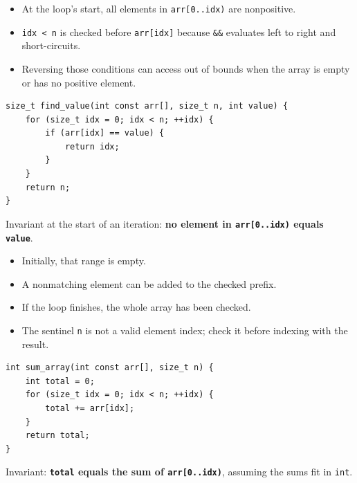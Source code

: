 \documentclass[11pt,a4paper]{article}
\providecommand{\tightlist}{\setlength{\itemsep}{0pt}\setlength{\parskip}{0pt}}
\begin{document}
\begin{itemize}
\tightlist
\item
  At the loop's start, all elements in \texttt{arr{[}0..idx)} are nonpositive.
\item
  \texttt{idx\ \textless{}\ n} is checked before \texttt{arr{[}idx{]}} because \texttt{\&\&} evaluates left to right and short-circuits.
\item
  Reversing those conditions can access out of bounds when the array is empty or has no positive element.
\end{itemize}

\label{linear-search-and-summation}
\hypertarget{linear-search-and-summation}{}

\label{linear-search}
\hypertarget{linear-search}{}

\begin{lstlisting}[style=cscode]
size_t find_value(int const arr[], size_t n, int value) {
    for (size_t idx = 0; idx < n; ++idx) {
        if (arr[idx] == value) {
            return idx;
        }
    }
    return n;
}
\end{lstlisting}

Invariant at the start of an iteration: \textbf{no element in \texttt{arr{[}0..idx)} equals \texttt{value}}.

\begin{itemize}
\tightlist
\item
  Initially, that range is empty.
\item
  A nonmatching element can be added to the checked prefix.
\item
  If the loop finishes, the whole array has been checked.
\item
  The sentinel \texttt{n} is not a valid element index; check it before indexing with the result.
\end{itemize}

\label{summation}
\hypertarget{summation}{}

\begin{lstlisting}[style=cscode]
int sum_array(int const arr[], size_t n) {
    int total = 0;
    for (size_t idx = 0; idx < n; ++idx) {
        total += arr[idx];
    }
    return total;
}
\end{lstlisting}

Invariant: \textbf{\texttt{total} equals the sum of \texttt{arr{[}0..idx)}}, assuming the sums fit in \texttt{int}.
\end{document}

